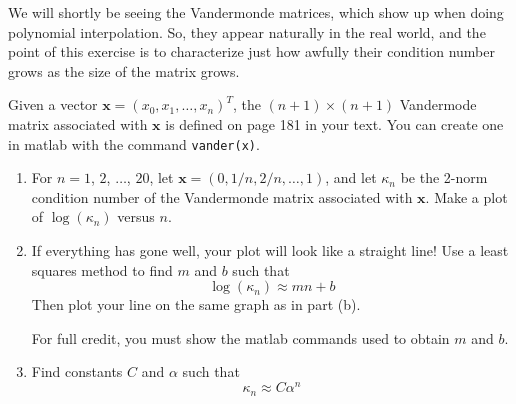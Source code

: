 \documentclass[12pt]{article}
\makeatletter
\theoremstyle{homework}
\newenvironment{exercise}[1]
{\def\@currentlabel{#1}\exercisecore}
{\endexercisecore}
\def\vx{\mathbf x}
\makeatother
\begin{document}
\begin{exercise}{Supplemental 3}
We will shortly be seeing the Vandermonde matrices,
which show up when doing polynomial interpolation.
So, they appear naturally in the real world, and
the point of this exercise is to characterize just
how awfully their condition number grows as the
size of the matrix grows.

Given a vector $\vx=(x_0,x_1,\ldots,x_n)^T$, the
$(n+1)\times (n+1)$ Vandermode matrix associated
with $\vx$ is defined on page 181 in your text.
You can create one in matlab with the command {\tt vander(x)}.
\begin{enumerate}
\item For $n=1$, $2$, $\ldots$, $20$, let $\vx=(0,1/n,2/n,\ldots, 1)$,
and let $\kappa_n$ be the 2-norm condition number of the
Vandermonde matrix associated with $\vx$.  Make
a plot of $\log(\kappa_n)$ versus $n$.
\item If everything has gone well, your plot will look like a straight line!  Use a least squares method to find $m$ and $b$ such that
\[
\log(\kappa_n) \approx m n + b
\]
Then plot your line on the same graph as in part (b).

For full credit, you must show the matlab commands used to
obtain $m$ and $b$.
\item Find constants $C$ and $\alpha$ such that
\[
\kappa_n \approx C \alpha^n
\]
\end{enumerate}
\end{exercise}
\end{document}
